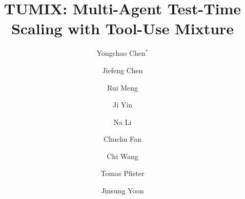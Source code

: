 \documentclass[11pt, a4paper, logo]{googlecloud}
\title{TUMIX: Multi-Agent Test-Time Scaling with Tool-Use Mixture}
\author[1,2]{Yongchao Chen$^{*}$}
\author[3]{Jiefeng Chen}
\author[3]{Rui Meng}
\author[1]{Ji Yin}
\author[2]{Na Li}
\author[1]{Chuchu Fan}
\author[4]{Chi Wang}
\author[3]{Tomas Pfister}
\author[3]{Jinsung Yoon}
\affil[1]{MIT}
\affil[2]{Harvard}
\affil[3]{Google Cloud AI Research}
\affil[4]{Google DeepMind}
\begin{document}


\maketitle


















\newpage
\renewcommand{\contentsname}{Appendix--TUMIX: Multi-Agent Test-Time Scaling with Tool-Use Mixture}
\tableofcontents %
\appendix


\end{document}
